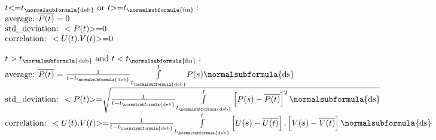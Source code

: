 \begin{equation*}
\begin{matrix}t\text{{\textless}=}t_{\normalsubformula{\text{deb}}}\text{ or }t\text{{\textgreater}=}t_{\normalsubformula{\text{fin}}}:\hfill\null \\\text{average:
}\overline{P(t)}=0\hfill\null \\\text{std\_deviation: }<P(t)\text{{\textgreater}=}0\hfill\null \\\text{correlation:
}<U(t).V(t)\text{{\textgreater}=0}\hfill\null \\\text{ }\hfill\null \\t>t_{\normalsubformula{\text{deb}}}\text{ and }t<t_{\normalsubformula{\text{fin}}}:\hfill\null
\\\text{average: }\overline{P(t)}=\frac 1{t-t_{\normalsubformula{\text{deb}}}}\overset
t{\underset{t_{\normalsubformula{\text{deb}}}}{\int }}P(s)\normalsubformula{\text{ds}}\hfill\null
\\\text{std\_deviation: }<P(t)\text{{\textgreater}=}\sqrt{\frac 1{t-t_{\normalsubformula{\text{deb}}}}\overset
t{\underset{t_{\normalsubformula{\text{deb}}}}{\int
}}\left[P(s)-\overline{P(t)}\right]^2\normalsubformula{\text{ds}}}\hfill\null \\\text{correlation:
}<U(t).V(t)\text{{\textgreater}=}\frac 1{t-t_{\normalsubformula{\text{deb}}}}\overset
t{\underset{t_{\normalsubformula{\text{deb}}}}{\int
}}\left[U(s)-\overline{U(t)}\right].\left[V(s)-\overline{V(t)}\right]\normalsubformula{\text{ds}}\hfill\null
\end{matrix}\hfill 
\end{equation*}
